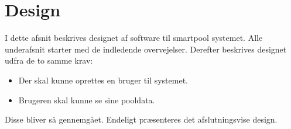 \chapter{Design}\label{cha:design}

I dette afsnit beskrives designet af software til \gls{smartpool} systemet. Alle underafsnit starter med de indledende overvejelser. Derefter beskrives designet udfra de to samme krav: 

\begin{itemize}
	\item Der skal kunne oprettes en bruger til systemet.
	\item Brugeren skal kunne se sine pooldata.
\end{itemize}

Disse bliver så gennemgået. Endeligt præsenteres det afslutningsvise design.


%
%
